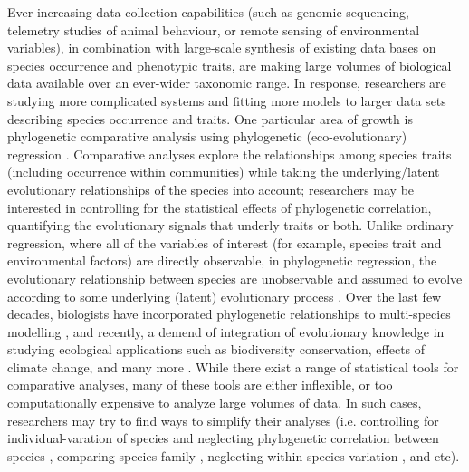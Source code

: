 \documentclass[12pt]{article}
\begin{document}
Ever-increasing data collection capabilities (such as genomic sequencing, telemetry studies of animal behaviour, or remote sensing of environmental variables), in combination with large-scale synthesis of existing data bases on species occurrence and phenotypic traits, are making large volumes of biological data available over an ever-wider taxonomic range.
In response, researchers are studying more complicated systems and fitting more models to larger data sets describing species occurrence and traits.
One particular area of growth is phylogenetic comparative analysis using phylogenetic (eco-evolutionary) regression \citep{hansen2012interpreting}. 
Comparative analyses explore the relationships among species traits (including occurrence within communities) while taking the underlying/latent evolutionary relationships of the species into account; researchers may be interested in controlling for the statistical effects of phylogenetic correlation, quantifying the evolutionary signals that underly traits or both.
Unlike ordinary regression, where all of the variables of interest (for example, species trait and environmental factors) are directly observable, in phylogenetic regression, the evolutionary relationship between species are unobservable and assumed to evolve according to some underlying (latent) evolutionary process \citep{felsenstein1985phylogenies, butler2004phylogenetic}. 
Over the last few decades, biologists have incorporated phylogenetic relationships to multi-species modelling \citep{garland1992procedures, freckleton2002phylogenetic, ord2010adaptation, davies2013phylogenetic} , and recently, a demend of integration of evolutionary knowledge in studying ecological applications such as biodiversity conservation, effects of climate change, and many more \citep{winter2013phylogenetic, santamaria2012evolution, lankau2011incorporating, lavergne2010biodiversity, mace2008evolutionary}. 
While there exist a range of statistical tools for comparative analyses, many of these tools are either inflexible, or too computationally expensive to analyze large volumes of data.
In such cases, researchers may try to find ways to simplify their analyses (i.e. controlling for individual-varation of species and neglecting phylogenetic correlation between species \citep{bunnefeld2012island}, comparing species family \citep{tella1999habitat}, neglecting within-species variation \citep{ord2010adaptation}, and etc).
\end{document}
